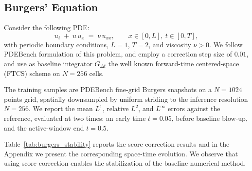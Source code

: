 \documentclass[letterpaper]{article} %
\begin{document}
\subsection{Burgers' Equation}\label{sec:burgers_pdebench}
Consider the following PDE:
\begin{equation}\label{eq:burgers_pde}
    u_t \;+\; u\,u_x \;=\; \nu\,u_{xx},
    \qquad x \in [0, L],\ t \in [0, T],
\end{equation}
with periodic boundary conditions, $L = 1$, $T = 2$, and viscosity \(\nu > 0\).
We follow PDEBench \citep{PDEBench2022} formulation of this problem, and employ a correction step size of $0.01$,
and use as baseline integrator $G_{\Delta t}$ the well known forward-time centered-space
(FTCS) scheme on $N = 256$ cells. 



The training samples are PDEBench fine-grid Burgers snapshots on a $N=1024$ points grid, spatially downsampled by uniform striding to the
inference resolution $N = 256$. We report the
mean $L^1$, relative
$L^2$, and $L^\infty$ errors against the reference, evaluated at two times:
an early time $t = 0.05$, before baseline blow-up, and the active-window end $t = 0.5$.

Table~\ref{tab:burgers_stability} reports the score correction results and
in the Appendix we present   the corresponding space-time evolution. We observe that using score correction enables the stabilization of the baseline numerical method. 



\end{document}
